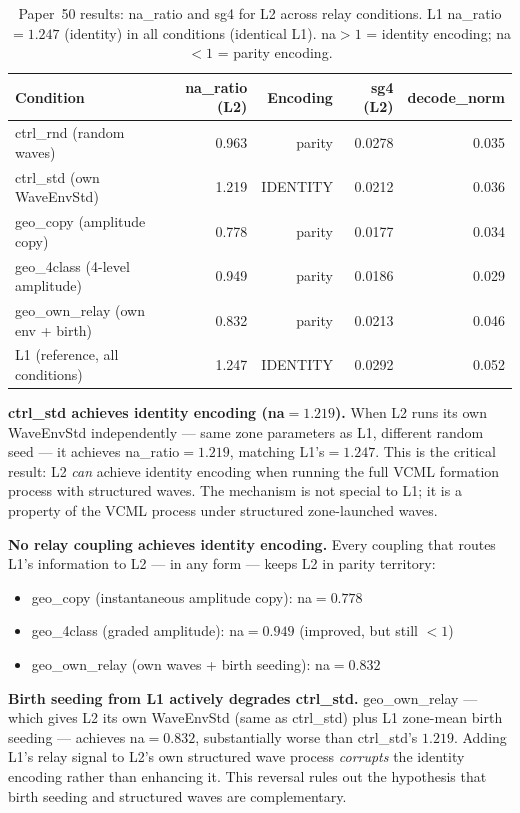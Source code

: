 \documentclass[11pt,a4paper]{article}
\begin{document}
\begin{table}[h]
\centering
\caption{Paper~50 results: na\_ratio and sg4 for L2 across relay conditions.
L1 na\_ratio$=1.247$ (identity) in all conditions (identical L1).
na$>1$ = identity encoding; na$<1$ = parity encoding.}
\label{tab:main}
\begin{tabular}{lrrrr}
\toprule
Condition & na\_ratio (L2) & Encoding & sg4 (L2) & decode\_norm \\
\midrule
ctrl\_rnd (random waves)            & 0.963 & parity   & 0.0278 & 0.035 \\
ctrl\_std (own WaveEnvStd)          & 1.219 & IDENTITY & 0.0212 & 0.036 \\
geo\_copy (amplitude copy)          & 0.778 & parity   & 0.0177 & 0.034 \\
geo\_4class (4-level amplitude)     & 0.949 & parity   & 0.0186 & 0.029 \\
geo\_own\_relay (own env + birth)   & 0.832 & parity   & 0.0213 & 0.046 \\
\midrule
L1 (reference, all conditions)      & 1.247 & IDENTITY & 0.0292 & 0.052 \\
\bottomrule
\end{tabular}
\end{table}

\textbf{ctrl\_std achieves identity encoding (na$=1.219$).}
When L2 runs its own WaveEnvStd independently --- same zone parameters as L1, different
random seed --- it achieves na\_ratio$=1.219$, matching L1's$=1.247$.
This is the critical result: L2 \emph{can} achieve identity encoding when running
the full VCML formation process with structured waves.
The mechanism is not special to L1; it is a property of the VCML process under
structured zone-launched waves.

\textbf{No relay coupling achieves identity encoding.}
Every coupling that routes L1's information to L2 --- in any form --- keeps L2
in parity territory:
\begin{itemize}
  \item geo\_copy (instantaneous amplitude copy): na$=0.778$
  \item geo\_4class (graded amplitude): na$=0.949$ (improved, but still $<1$)
  \item geo\_own\_relay (own waves + birth seeding): na$=0.832$
\end{itemize}

\textbf{Birth seeding from L1 actively degrades ctrl\_std.}
geo\_own\_relay --- which gives L2 its own WaveEnvStd (same as ctrl\_std) plus
L1 zone-mean birth seeding --- achieves na$=0.832$, substantially worse than
ctrl\_std's $1.219$.
Adding L1's relay signal to L2's own structured wave process \emph{corrupts} the
identity encoding rather than enhancing it.
This reversal rules out the hypothesis that birth seeding and structured waves
are complementary.
\end{document}
